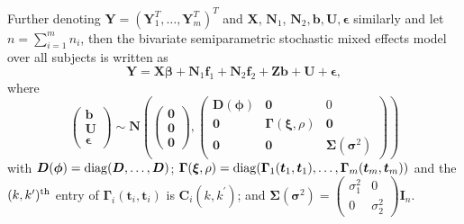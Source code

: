 \documentclass[article,lineno]{biometrika}
\begin{document}
Further denoting $\boldsymbol  Y = (\boldsymbol Y_1^T, \dots, \boldsymbol Y_m^T)^T$ and $\boldsymbol  X$, $\boldsymbol  N_1$, $\boldsymbol  N_2, \boldsymbol b, \boldsymbol U, \boldsymbol \epsilon$ similarly and let $n = \sum_{i = 1}^m n_i$, then  the bivariate semiparametric stochastic mixed effects model over all subjects is written as
\begin{equation} \label{propM}
\boldsymbol Y 
=
\boldsymbol{X}\boldsymbol{\beta} 
+ \boldsymbol N_1 \boldsymbol f_1 
+ \boldsymbol N_2 \boldsymbol f_2 
+ \boldsymbol{Z}\boldsymbol{b}
+ \boldsymbol U 
+ \boldsymbol \epsilon,
\end{equation}
where 
\[
 \begin{pmatrix}
  \boldsymbol b \\
  \boldsymbol U  \\
 \boldsymbol \epsilon
 \end{pmatrix}
 \sim 
 \boldsymbol N \left(
 \begin{pmatrix}
\boldsymbol 0 \\
\boldsymbol 0 \\
 \boldsymbol 0 
 \end{pmatrix},
  \begin{pmatrix}
  \boldsymbol D(\boldsymbol \phi) &  \boldsymbol 0 & 0 \\
  \boldsymbol 0 & \boldsymbol \Gamma (\boldsymbol \xi, \rho) & \boldsymbol 0 \\
 \boldsymbol 0 & \boldsymbol 0 &  \boldsymbol \Sigma (\boldsymbol \sigma^2) 
 \end{pmatrix}
 \right) 
\]
with 
$\boldsymbol D (\boldsymbol \phi) = {\rm diag} (\boldsymbol D, \dots, \boldsymbol D)$; 
$\boldsymbol \Gamma (\boldsymbol \xi, \rho) = {\rm diag} (  \boldsymbol \Gamma_1 (\boldsymbol t_1, \boldsymbol t_1), \dots,   \boldsymbol \Gamma_m(\boldsymbol t_m, \boldsymbol t_m))$
and the $(k, k^\prime)^{\rm th}$ entry of $ \boldsymbol \Gamma_i(\boldsymbol t_i, \boldsymbol t_i)$ is $\boldsymbol C_i(k, k^\prime)$;
and
$
\boldsymbol \Sigma(\boldsymbol \sigma^2) =
   \begin{pmatrix}
  \sigma^2_{1} &   0  \\
0 &   \sigma^2_{2} 
 \end{pmatrix} \boldsymbol I_{n}.
$
\end{document}

